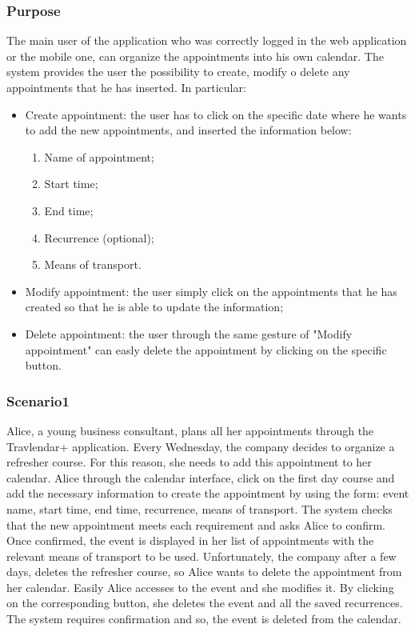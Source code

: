 \subsubsection{Purpose}
The main user of the application who was correctly logged in the web application or the mobile one, can organize the appointments into his own calendar. The system provides the user the possibility to create, modify o delete any appointments that he has inserted.
In particular:
\begin{itemize}
	\item Create appointment: the user has to click on the specific date where he wants to add the new appointments, and inserted the information below:
	\begin{enumerate}
		\item Name of appointment;
		\item Start time;
		\item End time;
		\item Recurrence (optional);
		\item Means of transport.
	\end{enumerate}
	\item Modify appointment: the user simply click on the appointments that he has created so that he is able to update the information;
	\item Delete appointment: the user through the same gesture of "Modify appointment" can easly delete the appointment by clicking on the specific button.
\end{itemize}

\subsubsection{Scenario1}
Alice, a young business consultant, plans all her appointments through the Travlendar+ application. Every Wednesday, the company decides to organize a refresher course. For this reason, she needs to add this appointment to her calendar.
Alice through the calendar interface, click on the first day course and add the necessary information to create the appointment by using the form: event name, start time, end time, recurrence, means of transport. The system checks that the new appointment meets each requirement and asks Alice to confirm.
Once confirmed, the event is displayed in her list of appointments with the relevant means of transport to be used. Unfortunately, the company after a few days, deletes the refresher course, so Alice wants to delete the appointment from her calendar. Easily Alice accesses to the event and she modifies it. By clicking on the corresponding button, she deletes the event and all the saved recurrences. The system requires confirmation and so, the event is deleted from the calendar.

